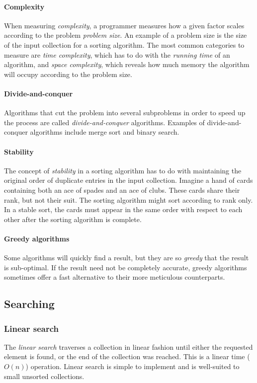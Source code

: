 \documentclass{article}
\begin{document}
{\paragraph{Complexity}
When measuring {\em complexity}, a programmer measures how a given factor scales according to the problem {\em problem size}.
An example of a problem size is the size of the input collection for a sorting algorithm. The most common categories to measure
are {\em time complexity}, which has to do with the {\em running time} of an algorithm, and {\em space complexity}, which
reveals how much memory the algorithm will occupy according to the problem size.

\paragraph{Divide-and-conquer}
Algorithms that cut the problem into several subproblems in order to speed up the process are called {\em divide-and-conquer}
algorithms\cite[p.30-38]{introduction-to-algorithms}. Examples of divide-and-conquer algorithms include merge sort and binary
search.

\paragraph{Stability}
The concept of {\em stability} in a sorting algorithm has to do with maintaining the original order of duplicate entries in the
input collection. Imagine a hand of cards containing both an ace of spades and an ace of clubs. These cards share their rank,
but not their suit. The sorting algorithm might sort according to rank only. In a stable sort, the cards must appear in the same
order with respect to each other after the sorting algorithm is complete.

\paragraph{Greedy algorithms}
Some algorithms will quickly find a result, but they are so {\em greedy} that the result is sub-optimal. If the result need
not be completely accurate, greedy algorithms sometimes offer a fast alternative to their more meticulous counterparts.


\subsection{Searching}
\subsubsection{Linear search}
The {\em linear search} traverses a collection in linear fashion until either the requested element is found,
or the end of the collection was reached. This is a linear time (\(O(n)\)) operation.
Linear search is simple to implement and is well-suited to small unsorted collections.

}
\end{document}
